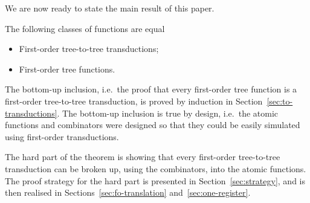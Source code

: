 We are now ready to state the main result of this paper. 
\begin{theorem}\label{thm:main}
    The following classes of functions are equal\begin{itemize}
        \item First-order tree-to-tree transductions;
        \item First-order tree functions.
    \end{itemize}
\end{theorem}

The bottom-up inclusion, i.e.~the proof that every first-order tree function is a first-order tree-to-tree transduction, is proved by induction in Section~\ref{sec:to-transductions}.  The bottom-up inclusion is true by design, i.e.~the atomic functions and combinators were designed so that they could be easily  simulated using first-order transductions. 

The hard part of the theorem is showing that every first-order tree-to-tree transduction can be broken up, using the combinators, into the atomic functions. The proof strategy for the hard part is presented in Section~\ref{sec:strategy}, and is then realised in Sections~\ref{sec:fo-translation} and~\ref{sec:one-register}.